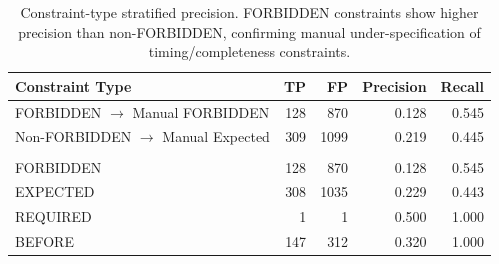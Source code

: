 \begin{table}[htbp]
\centering
\caption{Constraint-type stratified precision. FORBIDDEN constraints show higher precision than non-FORBIDDEN, confirming manual under-specification of timing/completeness constraints.}
\label{tab:constraint_type_precision}
\begin{tabular}{lrrrr}
\toprule
Constraint Type & TP & FP & Precision & Recall \\
\midrule
FORBIDDEN $\to$ Manual FORBIDDEN & 128 & 870 & 0.128 & 0.545 \\
Non-FORBIDDEN $\to$ Manual Expected & 309 & 1099 & 0.219 & 0.445 \\
\midrule &  &  &  &  \\
FORBIDDEN & 128 & 870 & 0.128 & 0.545 \\
EXPECTED & 308 & 1035 & 0.229 & 0.443 \\
REQUIRED & 1 & 1 & 0.500 & 1.000 \\
BEFORE & 147 & 312 & 0.320 & 1.000 \\
\bottomrule
\end{tabular}
\end{table}
